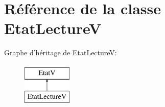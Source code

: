 \hypertarget{classEtatLectureV}{\section{Référence de la classe Etat\+Lecture\+V}
\label{classEtatLectureV}
}
Graphe d'héritage de Etat\+Lecture\+V\+:\begin{figure}[H]
\begin{center}
\leavevmode
\includegraphics[height=2.000000cm]{classEtatLectureV}
\end{center}
\end{figure}
